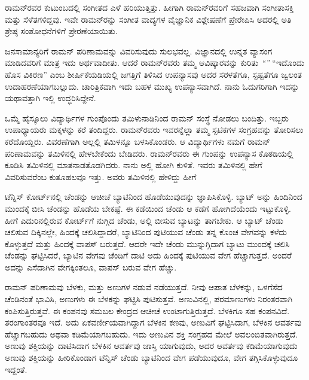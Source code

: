 \newpage

ರಾಮನ್‍ರವರ ಕುಟುಂಬದಲ್ಲಿ ಸಂಗೀತದ ಎಳೆ ಹರಿಯುತ್ತಿತ್ತು. ಹೀಗಾಗಿ ರಾಮನ್‍ರವರಿಗೆ ಸಹಜವಾಗಿ ಸಂಗೀತಾಸಕ್ತಿ ಮತ್ತು ಸೆಳೆತಗಳಿದ್ದವು. ಇವೇ ರಾಮನ್‍ರನ್ನು ಸಂಗೀತ ವಾದ್ಯಗಳ ವೈಜ್ಞಾನಿಕ ವಿಶ್ಲೇಷಣೆಗೆ ಪ್ರೇರೇಪಿಸಿ ಅದರಲ್ಲಿ ಅತಿ ಶ್ರೇಷ್ಠ ಸಂಶೋಧನೆಗಳಿಗೆ ಪ್ರೇರಣೆಯಾಯಿತು.



ಜನಸಾಮಾನ್ಯರಿಗೆ ರಾಮನ್ ಪರಿಣಾಮವನ್ನು ವಿವರಿಸುವುದು ಸುಲಭವಲ್ಲ. ವಿಜ್ಞಾನದಲ್ಲಿ ಉನ್ನತ ವ್ಯಾಸಂಗ ಮಾಡಿದವರಿಗೆ ಮಾತ್ರ ಇದು ಅರ್ಥವಾದೀತು. ಆದರೆ ರಾಮನ್‍ರವರು ತಮ್ಮ ಆವಿಷ್ಕಾರವನ್ನು ಕುರಿತು \textit{“”} “ಇದೊಂದು ಹೊಸ ವಿಕಿರಣ” ಎಂಬ ಶೀರ್ಷಿಕೆಯಡಿಯಲ್ಲಿ ಜಗತ್ತಿಗೆ ತಿಳಿಸಿದ ಉಪನ್ಯಾಸವು ಅದರ ಸರಳತೆಗೂ, ಸ್ಪಷ್ಟತೆಗೂ ಜ್ವಲಂತ ಉದಾಹರಣೆಯಾಗಬಲ್ಲುದು. ಚಾರಿತ್ರಿಕವಾಗಿ ಇದು ಬಹಳ ಮುಖ್ಯ ಉಪನ್ಯಾಸವಾಗಿದೆ. ನಾನು ಓದುಗರಿಗಾಗಿ ಇದನ್ನು ಯಥಾವತ್ತಾಗಿ ಇಲ್ಲಿ ಉದ್ಧರಿಸಿದ್ದೇನೆ.

ಒಮ್ಮೆ ಹೈಸ್ಕೂಲು ವಿದ್ಯಾರ್ಥಿಗಳ ಗುಂಪೊಂದು ತಮಿಳುನಾಡಿನಿಂದ ರಾಮನ್ ಸಂಸ್ಥೆ ನೋಡಲು ಬಂದಿತ್ತು. ಇಬ್ಬರು ಉಪಾಧ್ಯಾಯರು  ಮಕ್ಕಳನ್ನು ಕರೆ ತಂದಿದ್ದರು. ರಾಮನ್‍ರವರು ಇವರನ್ನೆಲ್ಲಾ ತಮ್ಮ ಸ್ಪಟಿಕಗಳ ಸಂಗ್ರಹವನ್ನು ತೋರಿಸಲು ಕರೆದೊಯ್ದರು. ವಿವರಣೆಗಾಗಿ ಅಲ್ಲಲ್ಲಿ ತಮಿಳನ್ನೂ ಬಳಸಿಕೊಂಡರು. ಆ ವಿದ್ಯಾರ್ಥಿಗಳು ನಮಗೆ ರಾಮನ್ ಪರಿಣಾಮವನ್ನು ತಮಿಳಿನಲ್ಲಿ ಹೇಳಬೇಕೆಂದು ಬೇಡಿದರು. ರಾಮನ್‍ರವರು ಈ ಗುಂಪನ್ನು ಉಪನ್ಯಾಸ ಕೊಠಡಿಯಲ್ಲಿ ಕೂಡಿಸಿ ತಮಿಳಿನಲ್ಲಿ ಮಾತನಾಡತೊಡಗಿದರು. ನಾನು ಅಲ್ಲಿ ಹೋಗಿ ಕುಳಿತೆ. ಇವರು ತಮಿಳಿನಲ್ಲಿ ಹೇಗೆ ವಿವರಿಸುವರೆಂಬ ಕುತೂಹಲವೂ ಇತ್ತು. ಅವರು ತಮಿಳಿನಲ್ಲಿ ಹೇಳಿದ್ದು ಹೀಗೆ

\enginline{--}ಟೆನ್ನಿಸ್ ಕೋರ್ಟ್‌ನಲ್ಲಿ ಚೆಂಡನ್ನು ಆಚೀಚೆ ಬ್ಯಾಟಿನಿಂದ ಹೊಡೆಯುವುದನ್ನು ಜ್ಞಾಪಿಸಿಕೊಳ್ಳಿ. ಬ್ಯಾಟ್ ಅನ್ನು ಹಿಂದಿನಿಂದ ಮುಂದಕ್ಕೆ ಬೀಸಿ ಚೆಂಡನ್ನು ಹೊಡೆಯ ಬೇಕಷ್ಟೆ. ಈ ಕಡೆಯಿಂದ ಚೆಂಡು ಆ ಕಡೆಗೆ ಹೋಗಿದೆಯೆಂದು ಇಟ್ಟುಕೊಳ್ಳಿ. ಹೀಗೆ ಎದುರಿನಲ್ಲಿರುವ ಕೋರ್ಟ್‌ಗೆ ನುಗ್ಗಿದ ಚೆಂಡು, ಅಲ್ಲಿ ಬೀಸುವ ಬ್ಯಾಟನ್ನು ತಾಗಬೇಕು. ಆ ಬ್ಯಾಟ್ ಚೆಂಡು ಚಲಿಸುವ ದಿಕ್ಕಿನಲ್ಲೇ, ಹಿಂದಕ್ಕೆ ಚಲಿಸಿದ್ದಾದರೆ, ಬ್ಯಾಟಿನಿಂದ ಪುಟಿಯುವ ಚೆಂಡು ತನ್ನ ಕೊಂಚ ವೇಗವನ್ನು ಕಳೆದು ಕೊಳ್ಳುತ್ತದೆ ಮತ್ತು ಹಿಂದಕ್ಕೆ ವಾಪಸ್ ಬರುತ್ತದೆ. ಆದರೇ ಇದೇ ಚೆಂಡು ಮುನ್ನುಗ್ಗಿದಾಗ ಬ್ಯಾಟು ಮುಂದಕ್ಕೆ ಚಲಿಸಿ ಚೆಂಡನ್ನು ಘಟ್ಟಿಸಿದರೆ, ಬ್ಯಾಟಿನ ವೇಗವು ಚೆಂಡಿಗೆ ದಾಟಿ ಅದು ಹಿಂದಕ್ಕೆ ಪುಟಿಯುವ ವೇಗ ಹೆಚ್ಚಾಗುತ್ತದೆ. ಅಂದರೆ ಅದನ್ನು ಎಸೆದಾಗಿನ ವೇಗಕ್ಕಿಂತಲೂ, ವಾಪಸ್ ಬರುವ ವೇಗ ಹೆಚ್ಚು.

ರಾಮನ್ ಪರಿಣಾಮವು ಬೆಳಕು, ಮತ್ತು ಅಣುಗಳ ನಡುವೆ ನಡೆಯುತ್ತದೆ. ನೀವು ಆಪಾತ ಬೆಳಕನ್ನು, ಒಳಗೆಸೆದ ಚೆಂಡಿನಂತೆ ಭಾವಿಸಿ, ಅಣುಗಳು ಈ ಬೆಳಕನ್ನು ಘಟ್ಟಿಸಿ ಪುಟಿಸುತ್ತವೆ. ಅಣುವಿನಲ್ಲಿ, ಪರಮಾಣುಗಳು ನಿರಂತರವಾಗಿ ಕಂಪಿಸುತ್ತಿರುತ್ತವೆ. ಈ ಕಂಪನವು ಸಮಬಲ ಕೇಂದ್ರದ ಆಚೀಚೆ ಉಂಟಾಗುತ್ತಿರುತ್ತದೆ. ಬೆಳಕಿಗೂ ಸಹ ಕಂಪನವಿದೆ. ತರಂಗಾಂತರವೂ ಇದೆ. ಅದು ಏಕವರ್ಣೀಯವಾಗಿದ್ದಾಗ ಬೆಳಕಿನ ಕಣವು, ಅಣುವಿಗೆ ಘಟ್ಟಿಸಿದಾಗ, ಬೆಳಕಿನ ಆವರ್ತವು ಹೆಚ್ಚಾಗಬಹುದು ಅಥವಾ ಕಡಿಮೆಯಾಗಬಹುದು. ಇದು ಅಣುವಿನ ಶಕ್ತಿ ಸಂಗ್ರಹದ ಮೇಲೆ ಅವಲಂಬಿತವಾಗಿರುತ್ತದೆ. ಅಣುವು ಶಕ್ತಿಯನ್ನು ದಾಟಿಸಿದಾಗ ಬೆಳಕಿನ ಆವರ್ತವು ಜಾಸ್ತಿ ಯಾಗುವುದು, ಅದರ ಆವರ್ತವು ಕಡಿಮೆಯಾಗುವುದು  ಅಣುವು ಶಕ್ತಿಯನ್ನು ಹೀರಿಕೊಂಡಾಗ ಟೆನ್ನಿಸ್ ಚೆಂಡು ಬ್ಯಾಟಿನಿಂದ ವೇಗ ಪಡೆಯುವುದೂ, ವೇಗ ತಗ್ಗಿಸಿಕೊಳ್ಳುವುದೂ ಇದ್ದಂತೆ.

